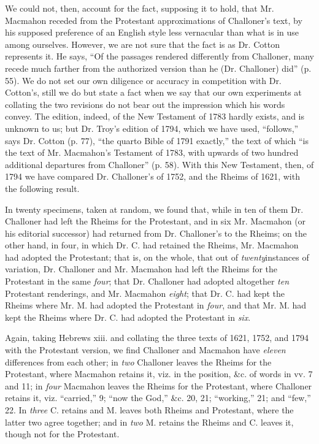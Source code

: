We could not, then, account for the fact, supposing it to hold,
that Mr. Macmahon receded from the Protestant approximations of
Challoner's text, by his supposed preference of an English style less
vernacular than what is in use among ourselves. However, we are not
sure that the fact is as Dr. Cotton represents it. He says, ``Of
the passages rendered differently from Challoner, many recede much
farther from the authorized version than he (Dr. Challoner)
did'' (p. 55). We do not set our own diligence or accuracy in
competition with Dr. Cotton's, still we do but state a fact when we
say that our own experiments at collating the two revisions do not
bear out the impression which his words convey. The edition, indeed,
of the New Testament of 1783 hardly exists, and is unknown to us; but
Dr. Troy's edition of 1794, which we have used, ``follows,''
says Dr. Cotton (p. 77), ``the quarto Bible of 1791 exactly,''
the text of which ``is the text of Mr. Macmahon's Testament of
1783, with upwards of two hundred additional departures from Challoner''
(p. 58). With this New Testament, then, of 1794 we have compared Dr.
Challoner's of 1752, and the Rheims of 1621, with the following
result.

In twenty specimens, taken at random, we found that, while in ten
of them Dr. Challoner had left the Rheims for the Protestant, and in
six Mr. Macmahon (or his editorial successor) had returned from Dr.
Challoner's to the Rheims; on the other hand, in four, in which Dr. C.
had retained the Rheims, Mr. Macmahon had adopted the Protestant; that
is, on the whole, that out of \emph{twenty}instances of variation,
Dr. Challoner and Mr. Macmahon had left the Rheims for the Protestant
in the same \emph{four}; that Dr. Challoner had adopted altogether \emph{ten}
Protestant renderings, and Mr. Macmahon \emph{eight}; that Dr. C. had
kept the Rheims where Mr. M. had adopted the Protestant in \emph{four},
and that Mr. M. had kept the Rheims where Dr. C. had adopted the
Protestant in \emph{six}.

Again, taking Hebrews xiii. and collating the three texts of
1621, 1752, and 1794 with the Protestant version, we find Challoner
and Macmahon have \emph{eleven} differences from each other; in \emph{two}
Challoner leaves the Rheims for the Protestant, where Macmahon retains
it, viz. in the position, \&c. of words in vv. 7 and 11; in \emph{four}
Macmahon leaves the Rheims for the Protestant, where Challoner retains
it, viz. ``carried,'' 9; ``now the God,'' \&c. 20,
21; ``working,'' 21; and ``few,'' 22. In \emph{three}
C. retains and M. leaves both Rheims and Protestant, where the latter
two agree together; and in \emph{two} M. retains the Rheims and C.
leaves it, though not for the Protestant.

